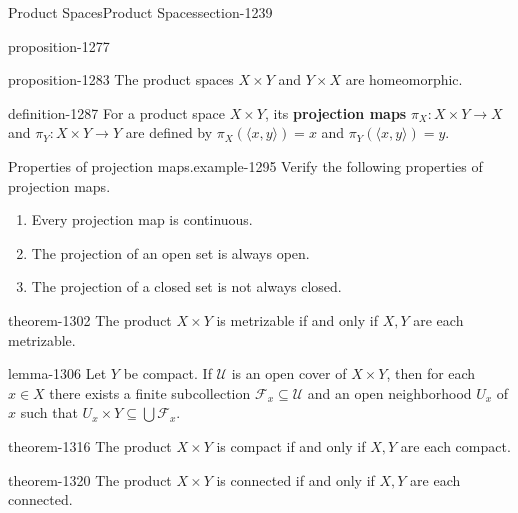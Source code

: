 \documentclass[oneside,10pt,]{article}
\newcommand{\terminology}[1]{\textbf{#1}}
\newcommand{\tuple}[1]{\langle #1 \rangle}
\newcommand{\mc}{\mathcal}
\begin{document}
\begin{sectionptx}{Product Spaces}{}{Product Spaces}{}{}{section-1239}
\begin{proposition}{}{}{proposition-1277}
\end{proposition}
\begin{proposition}{}{}{proposition-1283}%
\hypertarget{p-1284}{}%
The product spaces \(X\times Y\) and \(Y\times X\) are homeomorphic.%
\end{proposition}
\begin{definition}{}{definition-1287}%
\hypertarget{p-1288}{}%
For a product space \(X\times Y\), its \terminology{projection maps} \(\pi_X:X\times Y\to X\) and \(\pi_Y:X\times Y\to Y\) are defined by \(\pi_X(\tuple{x,y})=x\) and \(\pi_Y(\tuple{x,y})=y\).%
\end{definition}
\begin{example}{Properties of projection maps.}{example-1295}%
\hypertarget{p-1297}{}%
Verify the following properties of projection maps.%
\leavevmode%
\begin{enumerate}
\item\hypertarget{li-1299}{}Every projection map is continuous.%
\item\hypertarget{li-1300}{}The projection of an open set is always open.%
\item\hypertarget{li-1301}{}The projection of a closed set is not always closed.%
\end{enumerate}
\end{example}
\begin{theorem}{}{}{theorem-1302}%
\hypertarget{p-1303}{}%
The product \(X\times Y\) is metrizable if and only if \(X,Y\) are each metrizable.%
\end{theorem}
\begin{lemma}{}{}{lemma-1306}%
\hypertarget{p-1307}{}%
Let \(Y\) be compact. If \(\mc U\) is an open cover of \(X\times Y\), then for each \(x\in X\) there exists a finite subcollection \(\mc F_x\subseteq\mc U\) and an open neighborhood \(U_x\) of \(x\) such that \(U_x\times Y\subseteq\bigcup\mc F_x\).%
\end{lemma}
\begin{theorem}{}{}{theorem-1316}%
\hypertarget{p-1317}{}%
The product \(X\times Y\) is compact if and only if \(X,Y\) are each compact.%
\end{theorem}
\begin{theorem}{}{}{theorem-1320}%
\hypertarget{p-1321}{}%
The product \(X\times Y\) is connected if and only if \(X,Y\) are each connected.%
\end{theorem}
\end{sectionptx}
%
%
\typeout{************************************************}
\end{document}
